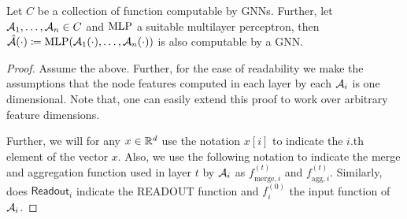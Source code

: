 \begin{lemma}\label{lem:composition_lemma_gnn}
    Let $C$ be a collection of function computable by GNNs. Further, let  $\mathcal{A}_1, \dots , \mathcal{A}_n \in C$ and $\text{MLP}$ a suitable multilayer perceptron, then \\$\hat{\mathcal{A}}(\cdot) \coloneqq \text{MLP}(\mathcal{A}_1(\cdot), \dots, \mathcal{A}_n(\cdot))$ is also computable by a GNN.
\end{lemma}

\begin{proof}
    Assume the above. Further, for the ease of readability we make the assumptions that the node features computed in each layer by each $\mathcal{A}_i$ is one dimensional. Note that, one can easily extend this proof to work over arbitrary feature dimensions.

    Further, we will for any $x \in \mathbb{R}^d$ use the notation $x[i]$ to indicate the $i$.th element of the vector $x$. Also, we use the following notation to indicate the merge and aggregation function used in layer $t$ by $\mathcal{A}_i$ as $f^{(t)}_{\text{merge}, i}$ and $f^{(t)}_{\text{agg}, i}$. Similarly, does $\textsf{Readout}_i$ indicate the \textsf{READOUT} function and $f^{(0)}_i$ the input function of $\mathcal{A}_i$.
    

\end{proof}
